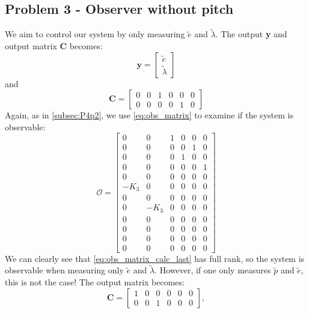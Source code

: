 \subsection{Problem 3 - Observer without pitch}\label{subsec:P4p3}
We aim to control our system by only measuring $\tilde{e}$ and $\tilde{\lambda}$. The output \textbf{y} and output matrix \textbf{C} becomes:
\begin{equation}\label{eq:y_P4p3}
\mathbf{y} = 
\begin{bmatrix}
\tilde{e}\\
\tilde{\lambda}
\end{bmatrix}
\end{equation}
and
\begin{equation}\label{eq:C_P4p3}
\mathbf{C} = 
    \begin{bmatrix}
    0 & 0 & 1 & 0 & 0 & 0 \\
    0 & 0 & 0 & 0 & 1 & 0 
    \end{bmatrix}
\end{equation}
Again, as in \ref{subsec:P4p2}, we use \eqref{eq:obs_matrix} to examine if the system is observable:
\begin{equation}\label{eq:obs_matrix_calc_last}
    \mathcal {O}=
    {\begin{bmatrix}
        0 & 0 & 1 & 0 & 0 & 0\\
        0 & 0 & 0 & 0 & 1 & 0\\
        0 & 0 & 0 & 1 & 0 & 0\\
        0 & 0 & 0 & 0 & 0 & 1\\
        0 & 0 & 0 & 0 & 0 & 0\\
        -K_3 & 0 & 0 & 0 & 0 & 0\\
        0 & 0 & 0 & 0 & 0 & 0\\
        0 & -K_3 & 0 & 0 & 0 & 0\\
        0 & 0 & 0 & 0 & 0 & 0\\
        0 & 0 & 0 & 0 & 0 & 0\\
        0 & 0 & 0 & 0 & 0 & 0\\
        0 & 0 & 0 & 0 & 0 & 0
    \end{bmatrix}}
\end{equation}
We can clearly see that \eqref{eq:obs_matrix_calc_last} has full rank, so the system is observable when measuring only $\tilde{e}$ and $\tilde{\lambda}$. However, if one only measures $\tilde{p}$ and $\tilde{e}$, this is not the case! The output matrix becomes:
\begin{equation}\nonumber
\mathbf{C} = 
    \begin{bmatrix}
    1 & 0 & 0 & 0 & 0 & 0 \\
    0 & 0 & 1 & 0 & 0 & 0 
    \end{bmatrix},
\end{equation}
